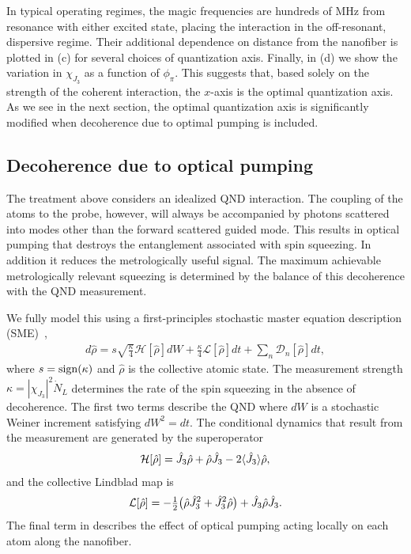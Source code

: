 \documentclass[aps,pra,twocolumn]{revtex4-1} %
\newcommand{\jz}{\hat{J}_3}
\newcommand{\chieff}{\chi_{J_3}}
\begin{document}
In typical operating regimes, the magic frequencies are hundreds of MHz from resonance with either excited state, placing the interaction in the off-resonant, dispersive regime.  
Their additional dependence on distance from the nanofiber is plotted in (c) for several choices of quantization axis.  
Finally, in (d) we show the variation in $\chieff$ as a function of $\phi_\pi$.  
This suggests that, based solely on the strength of the coherent interaction, the $x$-axis is the optimal quantization axis. 
As we see in the next section, the optimal quantization axis is significantly modified when decoherence due to optimal pumping is included.


	\subsection{Decoherence due to optical pumping}
	
The treatment above considers an idealized QND interaction. 
The coupling of the atoms to the probe, however, will always be accompanied by photons scattered into modes other than the forward scattered guided mode.  
This results in optical pumping that destroys the entanglement associated with spin squeezing.  In addition it reduces the metrologically useful signal.  
The maximum achievable metrologically relevant squeezing is determined by the balance of this decoherence with the QND measurement. 

We fully model this using a first-principles stochastic master equation description (SME)~\cite{jacobs_straightforward_2006, baragiola_three-dimensional_2014},
	\begin{align} \label{Eq::SME}
		d \hat{\rho} = s\sqrt{\frac{\kappa}{4}} \mathcal{H}[\hat{\rho}] dW + \frac{\kappa}{4} \mathcal{L}[\hat{\rho}] dt + \sum_n \mathcal{D}_n [\hat{\rho}] dt,
	\end{align}
where $s = {\rm sign}(\kappa)$ and $\hat{\rho}$ is the collective atomic state. 
The measurement strength $\kappa =|\chieff|^2 \dot{N}_L$ determines the rate of the spin squeezing in the absence of decoherence.  
The first two terms describe the QND where $dW$ is a stochastic Weiner increment satisfying $dW^2 = dt$. 
The conditional dynamics that result from the measurement are generated by the superoperator
	\begin{align}
		\mathcal{H}[\hat{\rho}] = \jz \hat{\rho} + \hat{\rho} \jz - 2 \expt{\jz} \hat{\rho},
	\end{align}
and the collective Lindblad map is
	\begin{align}
		\mathcal{L}[\hat{\rho}] = - \smallfrac{1}{2} \big( \hat{\rho}  \jz^2 + \jz^2 \hat{\rho} \big) + \jz \hat{\rho} \jz.
	\end{align}
The final term in  describes the effect of optical pumping acting locally on each atom along the nanofiber. 
\end{document}
